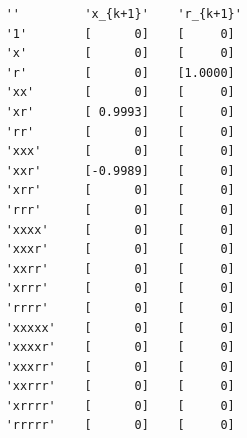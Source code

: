 \documentclass[onecolumn,11pt]{article}
\begin{document}
\begin{table}[where!]
\caption{\small Logistic map identified using sparse representation.}\label{Tab:Logistic}
\begin{center}
{\footnotesize
\begin{verbatim}
    ''         'x_{k+1}'    'r_{k+1}'
    '1'        [      0]    [     0]
    'x'        [      0]    [     0]
    'r'        [      0]    [1.0000]
    'xx'       [      0]    [     0]
    'xr'       [ 0.9993]    [     0]
    'rr'       [      0]    [     0]
    'xxx'      [      0]    [     0]
    'xxr'      [-0.9989]    [     0]
    'xrr'      [      0]    [     0]
    'rrr'      [      0]    [     0]
    'xxxx'     [      0]    [     0]
    'xxxr'     [      0]    [     0]
    'xxrr'     [      0]    [     0]
    'xrrr'     [      0]    [     0]
    'rrrr'     [      0]    [     0]
    'xxxxx'    [      0]    [     0]
    'xxxxr'    [      0]    [     0]
    'xxxrr'    [      0]    [     0]
    'xxrrr'    [      0]    [     0]
    'xrrrr'    [      0]    [     0]
    'rrrrr'    [      0]    [     0]
    \end{verbatim}
    }
    \end{center}
    \end{table}

\end{document}
